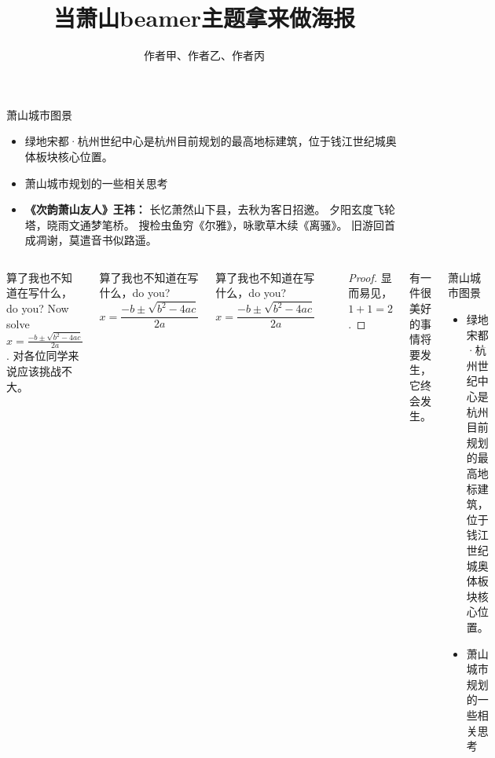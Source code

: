 \documentclass[t]{ctexbeamer}
\title{当萧山beamer主题拿来做海报}
\author{作者甲、作者乙、作者丙}
\begin{document}
\begin{frame}
    
\frametitle{\insertshorttitle}
\framesubtitle{\insertshortauthor}

\begin{block}{萧山城市图景}
\begin{itemize}
\item 绿地宋都·杭州世纪中心是杭州目前规划的最高地标建筑，位于钱江世纪城奥体板块核心位置。
\item 萧山城市规划的一些相关思考\cite{ChenCai2021,ZhuEtal2021}
\item \textbf{《次韵萧山友人》王祎：}
长忆萧然山下县，去秋为客日招邀。
夕阳玄度飞轮塔，晓雨文通梦笔桥。
搜检虫鱼穷《尔雅》，咏歌草木续《离骚》。
旧游回首成凋谢，莫遣音书似路遥。
\end{itemize}

\end{block}

\smallskip

\begin{columns}[T]

\begin{exampleblock}{算了我也不知道在写什么，do you?}
    Now solve $x = \frac{-b \pm \sqrt{b^2 -4ac}}{2a}$. 对各位同学来说应该挑战不大。
\end{exampleblock}

\begin{alertblock}{算了我也不知道在写什么，do you?}
    \[ x = \frac{-b \pm \sqrt{b^2 -4ac}}{2a} \]
\end{alertblock}

\begin{block}{算了我也不知道在写什么，do you?}
    \[ x = \frac{-b \pm \sqrt{b^2 -4ac}}{2a} \]
\end{block}

\textcolor{structure!80}{\rule{.1mm}{.22\textheight}}

\begin{proof}
    显而易见，$1+1=2$.
\end{proof}

\begin{theorem}
    有一件很美好的事情将要发生，它终会发生。
\end{theorem}

\begin{block}{萧山城市图景}
\begin{itemize}
\item 绿地宋都·杭州世纪中心是杭州目前规划的最高地标建筑，位于钱江世纪城奥体板块核心位置。
\item 萧山城市规划的一些相关思考\cite{ChenCai2021,ZhuEtal2021}
\end{itemize}
\end{block}


\end{columns}
\end{frame}
\end{document}
